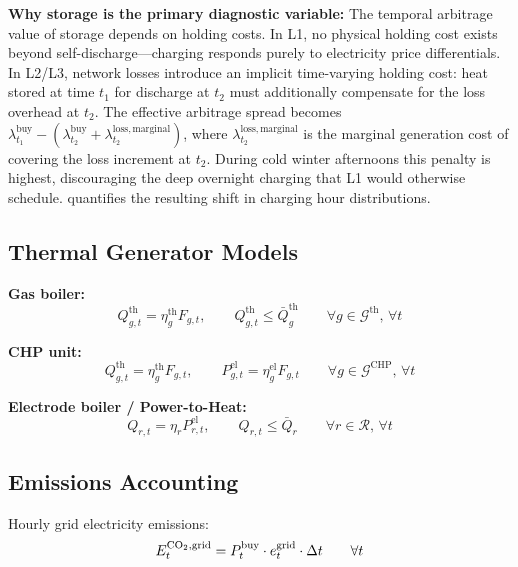 \documentclass[review,3p]{elsarticle}
\begin{document}
\textbf{Why storage is the primary diagnostic variable:} The temporal
arbitrage value of storage depends on holding costs. In L1, no
physical holding cost exists beyond self-discharge---charging responds
purely to electricity price differentials. In L2/L3, network losses
introduce an implicit time-varying holding cost: heat stored at time
$t_1$ for discharge at $t_2$ must additionally compensate for the loss
overhead at $t_2$. The effective arbitrage spread becomes
$\lambda_{t_1}^{\mathrm{buy}} - (\lambda_{t_2}^{\mathrm{buy}} +
\lambda_{t_2}^{\mathrm{loss,marginal}})$, where
$\lambda_{t_2}^{\mathrm{loss,marginal}}$ is the marginal generation
cost of covering the loss increment at $t_2$. During cold winter
afternoons this penalty is highest, discouraging the deep overnight
charging that L1 would otherwise schedule.
 quantifies the resulting shift in charging
hour distributions.

\subsection{Thermal Generator Models}
\label{sec:model_gen}

\textbf{Gas boiler:}
\begin{equation}
Q_{g,t}^{\mathrm{th}} = \eta_g^{\mathrm{th}} F_{g,t},
\qquad
Q_{g,t}^{\mathrm{th}} \leq \bar{Q}_g^{\mathrm{th}}
\qquad \forall g \in \mathcal{G}^{\mathrm{th}},\, \forall t
\label{eq:gen_thermal}
\end{equation}

\textbf{CHP unit:}
\begin{equation}
Q_{g,t}^{\mathrm{th}} = \eta_g^{\mathrm{th}} F_{g,t}, \qquad
P_{g,t}^{\mathrm{el}} = \eta_g^{\mathrm{el}} F_{g,t}
\qquad \forall g \in \mathcal{G}^{\mathrm{CHP}},\, \forall t
\label{eq:gen_chp}
\end{equation}

\textbf{Electrode boiler / Power-to-Heat:}
\begin{equation}
Q_{r,t} = \eta_{r} P_{r,t}^{\mathrm{el}}, \qquad
Q_{r,t} \leq \bar{Q}_r
\qquad \forall r \in \mathcal{R},\, \forall t
\label{eq:p2h}
\end{equation}

\subsection{Emissions Accounting}
\label{sec:model_emissions}

Hourly grid electricity emissions:
\begin{equation}
E_t^{\ce{CO2},\mathrm{grid}} = P_t^{\mathrm{buy}}
\cdot e_t^{\mathrm{grid}} \cdot \Delta t
\qquad \forall t
\label{eq:em_grid}
\end{equation}
\end{document}
